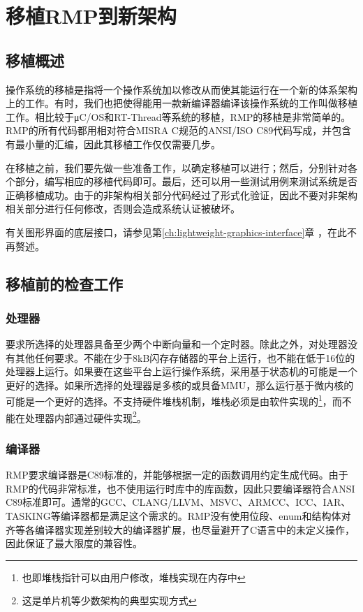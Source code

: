 \chapter{移植RMP到新架构}\label{ch:porting-rmp-to-a-new-architecture}

\section{移植概述}\label{sec:porting-overview}

操作系统的移植是指将一个操作系统加以修改从而使其能运行在一个新的体系架构上的工作。有时，我们也把使得能用一款新编译器编译该操作系统的工作叫做移植工作。相比较于μC/OS和RT-Thread等系统的移植，RMP的移植是非常简单的。RMP的所有代码都用相对符合MISRA C规范的ANSI/ISO C89代码写成，并包含有最小量的汇编，因此其移植工作仅仅需要几步。

在移植之前，我们要先做一些准备工作，以确定移植可以进行；然后，分别针对各个部分，编写相应的移植代码即可。最后，还可以用一些测试用例来测试系统是否正确移植成功。由于的非架构相关部分代码经过了形式化验证，因此不要对非架构相关部分进行任何修改，否则会造成系统认证被破坏。

有关图形界面的底层接口，请参见第\ref{ch:lightweight-graphics-interface}章
，在此不再赘述。

\section{移植前的检查工作}\label{sec:checks-before-porting}

\subsection{处理器}\label{subsec:processor}

要求所选择的处理器具备至少两个中断向量和一个定时器。除此之外，对处理器没有其他任何要求。不能在少于8kB闪存存储器的平台上运行，也不能在低于16位的处理器上运行。如果要在这些平台上运行操作系统，采用基于状态机的可能是一个更好的选择。如果所选择的处理器是多核的或具备MMU，那么运行基于微内核的可能是一个更好的选择。不支持硬件堆栈机制，堆栈必须是由软件实现的\footnote{也即堆栈指针可以由用户修改，堆栈实现在内存中}，而不能在处理器内部通过硬件实现\footnote{这是单片机等少数架构的典型实现方式}。

\subsection{编译器}\label{subsec:compiler}

RMP要求编译器是C89标准的，并能够根据一定的函数调用约定生成代码。由于RMP的代码非常标准，也不使用运行时库中的库函数，因此只要编译器符合ANSI C89标准即可。通常的GCC、CLANG/LLVM、MSVC、ARMCC、ICC、IAR、TASKING等编译器都是满足这个需求的。RMP没有使用位段、enum和结构体对齐等各编译器实现差别较大的编译器扩展，也尽量避开了C语言中的未定义操作，因此保证了最大限度的兼容性。

